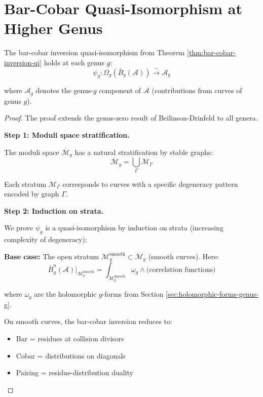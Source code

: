 \section{Bar-Cobar Quasi-Isomorphism at Higher Genus}
\label{sec:bar-cobar-qi-higher-genus}

\begin{theorem}\label{thm:higher-genus-inversion}
The bar-cobar inversion quasi-isomorphism from Theorem \ref{thm:bar-cobar-inversion-qi} 
holds at each genus $g$:
$$\psi_g: \Omega_g(\bar{B}_g(\mathcal{A})) \xrightarrow{\sim} \mathcal{A}_g$$

where $\mathcal{A}_g$ denotes the genus-$g$ component of $\mathcal{A}$ (contributions 
from curves of genus $g$).
\end{theorem}

\begin{proof}
The proof extends the genus-zero result of Beilinson-Drinfeld to all genera.

\textbf{Step 1: Moduli space stratification.}

The moduli space $\overline{\mathcal{M}}_g$ has a natural stratification by stable 
graphs:
$$\overline{\mathcal{M}}_g = \bigcup_{\Gamma} \mathcal{M}_\Gamma$$

Each stratum $\mathcal{M}_\Gamma$ corresponds to curves with a specific degeneracy 
pattern encoded by graph $\Gamma$.

\textbf{Step 2: Induction on strata.}

We prove $\psi_g$ is a quasi-isomorphism by induction on strata (increasing 
complexity of degeneracy):

\textbf{Base case:} The open stratum $\mathcal{M}_g^{\text{smooth}} \subset \overline{\mathcal{M}}_g$ 
(smooth curves). Here:
$$\bar{B}_g^n(\mathcal{A})|_{\mathcal{M}_g^{\text{smooth}}} = 
\int_{\mathcal{M}_g^{\text{smooth}}} \omega_g \wedge \text{(correlation functions)}$$

where $\omega_g$ are the holomorphic $g$-forms from Section \ref{sec:holomorphic-forms-genus-g}.

On smooth curves, the bar-cobar inversion reduces to:
\begin{itemize}
\item Bar = residues at collision divisors
\item Cobar = distributions on diagonals
\item Pairing = residue-distribution duality
\end{itemize}


\end{proof}
